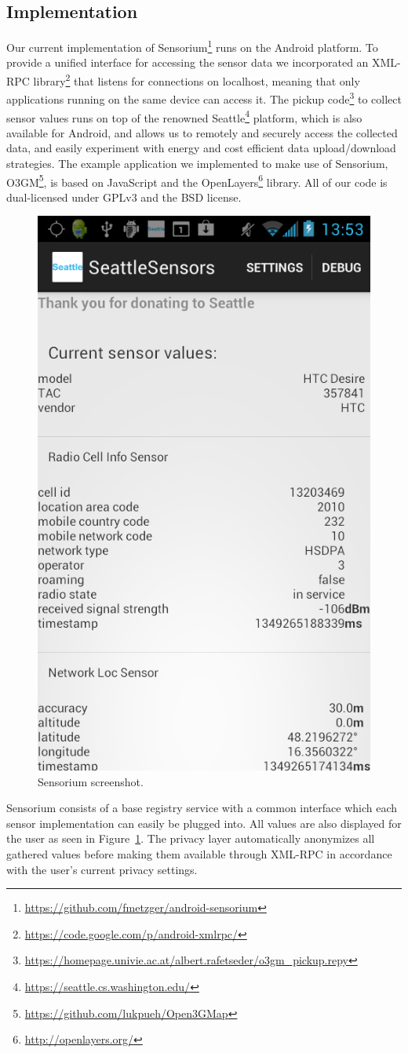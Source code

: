 \subsection{Implementation}

Our current implementation of Sensorium\footnote{\url{https://github.com/fmetzger/android-sensorium}} runs on the Android platform. To provide a unified interface for accessing the sensor data we incorporated an XML-RPC library\footnote{\url{https://code.google.com/p/android-xmlrpc/}} that listens for connections on localhost, meaning that only applications running on the same device can access it. The pickup code\footnote{\url{https://homepage.univie.ac.at/albert.rafetseder/o3gm_pickup.repy}} to collect sensor values runs on top of the renowned Seattle\footnote{\url{https://seattle.cs.washington.edu/}} platform, which is also available for Android, and allows us to remotely and securely access the collected data, and easily experiment with energy and cost efficient data upload/download strategies. The example application we implemented to make use of Sensorium, O3GM\footnote{\url{https://github.com/lukpueh/Open3GMap}}, is based on JavaScript and the OpenLayers\footnote{\url{http://openlayers.org/}} library. All of our code is dual-licensed under GPLv3 and the BSD license.

\begin{figure}[t!]
\centering
\includegraphics[width=0.45\columnwidth]{images/sesescreenshot.png}
\caption{\small Sensorium screenshot.}
\label{c5:fig:screenshot}
\end{figure}

Sensorium consists of a base registry service with a common interface which each sensor implementation can easily be plugged into. All values are also displayed for the user as seen in Figure~\ref{c5:fig:screenshot}. The privacy layer automatically anonymizes all gathered values before making them available through XML-RPC in accordance with the user's current privacy settings.

